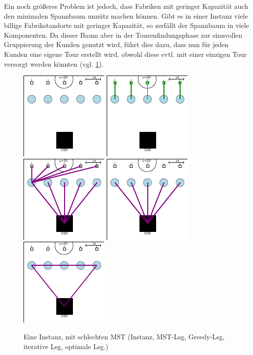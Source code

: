 \documentclass[a4paper,ngerman,11pt,bibtotoc]{scrartcl}
\theoremstyle{definition}
\theoremstyle{plain}
\theoremstyle{remark}
\newcommand{\MST}{MST}
\begin{document}
	Ein noch größeres Problem ist jedoch, dass Fabriken mit geringer Kapazität auch den minimalen Spannbaum unnütz machen können. Gibt es in einer Instanz viele billige Fabrikstandorte mit geringer Kapazität, so zerfällt der Spannbaum in viele Komponenten. Da dieser Baum aber in der Tourenfindungsphase zur sinnvollen Gruppierung der Kunden genutzt wird, führt dies dazu, dass nun für jeden Kunden eine eigene Tour erstellt wird, obwohl diese evtl. mit einer einzigen Tour versorgt werden könnten (vgl. \cref{fig:bsp:schlechterMST}).
	
	\begin{figure}[h]\centering
		\includegraphics[width=.19\textwidth]{bilder/beispiele/bsp3-instance.pdf}
		\includegraphics[width=.19\textwidth]{bilder/beispiele/bsp3-MST.pdf}
		\includegraphics[width=.19\textwidth]{bilder/beispiele/bsp3-Greedy.pdf}
		\includegraphics[width=.19\textwidth]{bilder/beispiele/bsp3-It.pdf}
		\includegraphics[width=.19\textwidth]{bilder/beispiele/bsp3-OPT.pdf}
		\caption{Eine Instanz, mit schlechten \MST{} (Instanz, \MST-Lsg, Greedy-Lsg, iterative Lsg, optimale Lsg.)}\label{fig:bsp:schlechterMST}
	\end{figure}
\end{document}
